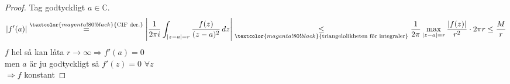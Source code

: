 \begin{proof}
Tag godtyckligt $a \in \mathbb{C}$.
\[ |f'(a)| \overset{\textcolor{magenta!80!black}{\text{CIF der.}}}{=} \left| \frac{1}{2\pi i}\int_{|z - a| = r} \frac{f(z)}{(z - a)^2}\,dz \right| \underset{\textcolor{magenta!80!black}{\text{triangelolikheten för integraler}}}{\le} \frac{1}{2\pi}\max_{|z - a| = r} \frac{|f(z)|}{r^2} \cdot 2\pi r \le \frac{M}{r} \]
$f$ hel så kan låta $r \to \infty \Rightarrow f'(a) = 0$\\
men $a$ är ju godtyckligt så $f'(z) = 0$ $\forall z$\\
$\Rightarrow f$ konstant
\end{proof}
